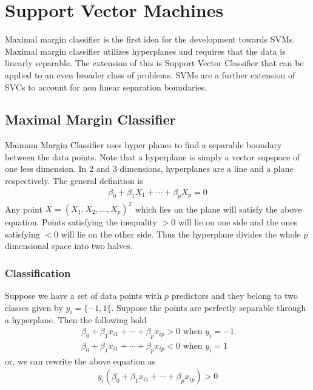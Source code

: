 \documentclass[11pt, a4paper]{article}
\begin{document}
    \section{Support Vector Machines}
    Maximal margin classifier is the first idea for the development towards SVMs. Maximal margin classifier utilizes hyperplanes and requires that the data is linearly separable. The extension of this is Support Vector Classifier that can be applied to an even broader class of problems. SVMs are a further extension of SVCs to account for non linear separation boundaries.
    

    \subsection{Maximal Margin Classifier}
    Maimum Margin Classifier uses hyper planes to find a separable boundary between the data points. Note that a hyperplane is simply a vector supspace of one less dimension. In 2 and 3 dimensions, hyperplanes are a line and a plane respectively. The general definition is
    \begin{align*}
        \beta_{0} + \beta_{1}X_{1} + \cdots + \beta_{p}X_{p} = 0
    \end{align*}
    Any point $X = (X_{1}, X_{2}, \ldots, X_{p})^{T}$ which lies on the plane will satisfy the above equation. Points satisfying the inequality $> 0$ will lie on one side and the ones satisfying $< 0$ will lie on the other side. Thus the hyperplane divides the whole $p$ dimensional space into two halves.\newline


    \subsubsection{Classification}
    Suppose we have a set of data points with $p$ predictors and they belong to two classes given by $y_{i} = \{-1 , 1\{$. Suppose the points are perfectly separable through a hyperplane. Then the following hold
    \begin{align*}
        \beta_{0} + \beta_{1}x_{i1} + \cdots + \beta_{p}x_{ip} > 0 \text{ when } y_{i} = -1\\
        \beta_{0} + \beta_{1}x_{i1} + \cdots + \beta_{p}x_{ip} < 0 \text{ when } y_{i} = 1
    \end{align*}
    or, we can rewrite the above equation as
    \begin{align*}
        y_{i}(\beta_{0} + \beta_{1}x_{i1} + \cdots + \beta_{p}x_{ip}) > 0
    \end{align*}
\end{document}
